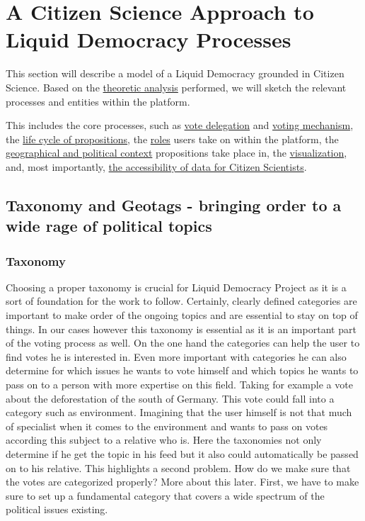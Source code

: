 
\chapter{A Citizen Science Approach to Liquid Democracy Processes}
\label{ch:Approach}

This section will describe a model of a Liquid Democracy grounded in Citizen Science. Based on the \hyperref[ch:Theory]{theoretic analysis} performed, we will sketch the relevant processes and entities within the platform. 

This includes the core processes, such as \hyperref[sec:Model_VoteDelegation]{vote delegation} and \hyperref[sec:Voting_Mechanism]{voting mechanism}, the \hyperref[sec:Model_Propositions]{life cycle of propositions}, the \hyperref[sec:UserRoles]{roles} users take on within the platform, the \hyperref[sec:Model_Contexts]{geographical and political context} propositions take place in, the \hyperref[sec:Model_Visualization]{visualization}, and, most importantly, \hyperref[sec:Model_ResearchersAccess]{the accessibility of data for Citizen Scientists}. 

\section{Taxonomy and Geotags - bringing order to a wide rage of political topics}
\label{sec:Model_Contexts}
\subsection{Taxonomy}
Choosing a proper taxonomy is crucial for Liquid Democracy Project as it is a sort of foundation for the work to follow. Certainly, clearly defined categories are important to make order of the ongoing topics and are essential to stay on top of things. In our cases however this taxonomy is essential as it is an important part of the voting process as well. On the one hand the categories can help the user to find votes he is interested in. Even more important with categories he can also determine for which issues he wants to vote himself and which topics he wants to pass on to a person with more expertise on this field. Taking for example a vote about the deforestation of the south of Germany. This vote could fall into a category such as environment. Imagining that the user himself is not that much of specialist when it comes to the environment and wants to pass on votes according this subject to a relative who is. Here the taxonomies not only determine if he get the topic in his feed but it also could automatically be passed on to his relative. This highlights a second problem. How do we make sure that the votes are categorized properly? More about this later. First, we have to make sure to set up a fundamental category that covers a wide spectrum of the political issues existing.

